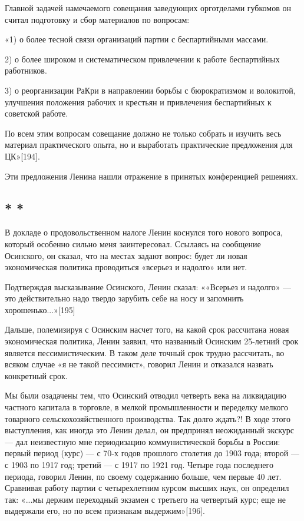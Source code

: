 \documentclass[12pt, a4paper, openany]{book}
\begin{document}
Главной задачей намечаемого совещания заведующих орготделами губкомов он считал подготовку и сбор материалов по вопросам:

«1) о более тесной связи организаций партии с беспартийными массами.

2) о более широком и систематическом привлечении к работе беспартийных работников.

3) о реорганизации РаКри в направлении борьбы с бюрократизмом и волокитой, улучшения положения рабочих и крестьян и привлечения беспартийных к советской работе.

По всем этим вопросам совещание должно не только собрать и изучить весь материал практического опыта, но и выработать практические предложения для ЦК»[194].

Эти предложения Ленина нашли отражение в принятых конференцией решениях.

\subsection*{\center * * *}

В докладе о продовольственном налоге Ленин коснулся того нового вопроса, который особенно сильно меня заинтересовал. Ссылаясь на сообщение Осинского, он сказал, что на местах задают вопрос: будет ли новая экономическая политика проводиться «всерьез и надолго» или нет.

Подтверждая высказывание Осинского, Ленин сказал: ««Всерьез и надолго» — это действительно надо твердо зарубить себе на носу и запомнить хорошенько...»[195]

Дальше, полемизируя с Осинским насчет того, на какой срок рассчитана новая экономическая политика, Ленин заявил, что названный Осинским 25-летний срок является пессимистическим. В таком деле точный срок трудно рассчитать, во всяком случае «я не такой пессимист», говорил Ленин и отказался назвать конкретный срок.

Мы были озадачены тем, что Осинский отводил четверть века на ликвидацию частного капитала в торговле, в мелкой промышленности и переделку мелкого товарного сельскохозяйственного производства. Так долго ждать?! В ходе этого выступления, как иногда это Ленин делал, он предпринял неожиданный экскурс — дал неизвестную мне периодизацию коммунистической борьбы в России: первый период (курс) — с 70-х годов прошлого столетия до 1903 года; второй — с 1903 по 1917 год; третий — с 1917 по 1921 год. Четыре года последнего периода, говорил Ленин, по своему содержанию больше, чем первые 40 лет. Сравнивая работу партии с четырехлетним курсом высших наук, он определил так: «...мы держим переходный экзамен с третьего на четвертый курс; еще не выдержали его, но по всем признакам выдержим»[196].
\end{document}
